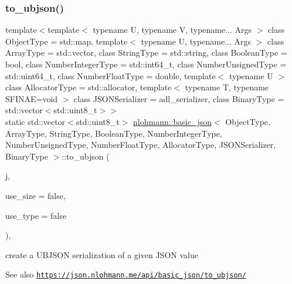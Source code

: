 \subsubsection{\texorpdfstring{to\+\_\+ubjson()}{to\_ubjson()}\hspace{0.1cm}{\footnotesize\ttfamily [1/3]}}
{\footnotesize\ttfamily template$<$template$<$ typename U, typename V, typename... Args $>$ class Object\+Type = std\+::map, template$<$ typename U, typename... Args $>$ class Array\+Type = std\+::vector, class String\+Type  = std\+::string, class Boolean\+Type  = bool, class Number\+Integer\+Type  = std\+::int64\+\_\+t, class Number\+Unsigned\+Type  = std\+::uint64\+\_\+t, class Number\+Float\+Type  = double, template$<$ typename U $>$ class Allocator\+Type = std\+::allocator, template$<$ typename T, typename S\+F\+I\+N\+A\+E=void $>$ class J\+S\+O\+N\+Serializer = adl\+\_\+serializer, class Binary\+Type  = std\+::vector$<$std\+::uint8\+\_\+t$>$$>$ \\
static std\+::vector$<$std\+::uint8\+\_\+t$>$ \hyperlink{classnlohmann_1_1basic__json}{nlohmann\+::basic\+\_\+json}$<$ Object\+Type, Array\+Type, String\+Type, Boolean\+Type, Number\+Integer\+Type, Number\+Unsigned\+Type, Number\+Float\+Type, Allocator\+Type, J\+S\+O\+N\+Serializer, Binary\+Type $>$\+::to\+\_\+ubjson (\begin{DoxyParamCaption}\item[{const \hyperlink{classnlohmann_1_1basic__json}{basic\+\_\+json}$<$ Object\+Type, Array\+Type, String\+Type, Boolean\+Type, Number\+Integer\+Type, Number\+Unsigned\+Type, Number\+Float\+Type, Allocator\+Type, J\+S\+O\+N\+Serializer, Binary\+Type $>$ \&}]{j,  }\item[{const bool}]{use\+\_\+size = {\ttfamily false},  }\item[{const bool}]{use\+\_\+type = {\ttfamily false} }\end{DoxyParamCaption})\hspace{0.3cm}{\ttfamily [inline]}, {\ttfamily [static]}}



create a U\+B\+J\+S\+ON serialization of a given J\+S\+ON value 

\begin{DoxySeeAlso}{See also}
\href{https://json.nlohmann.me/api/basic_json/to_ubjson/}{\tt https\+://json.\+nlohmann.\+me/api/basic\+\_\+json/to\+\_\+ubjson/} 
\end{DoxySeeAlso}
\mbox{\label{classnlohmann_1_1basic__json_aa9fa5da521622c6c655581840da75090}} 
